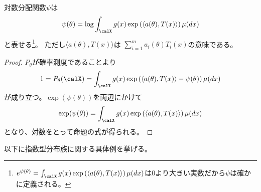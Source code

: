 \documentclass[report]{jlreq}
\begin{document}
\begin{proposition}[対数分配関数の式]
    対数分配関数$\psi$は
    \begin{equation}
        \psi(\theta)
            = \log \int_\calX g(x) \exp\myparen{
                \langle a(\theta), T(x) \rangle
            } \mu(dx)
    \end{equation}
    と表せる\footnote{
        $e^{\psi(\theta)} = \int_\calX g(x) \exp\myparen{
            \langle a(\theta), T(x) \rangle
        } \mu(dx)$は0より大きい実数だから$\psi$は確かに定義される。
    }。
    ただし$\langle a(\theta), T(x) \rangle$は
    $\sum_{i = 1}^m a_i(\theta) T_i(x)$の意味である。
\end{proposition}

\begin{proof}
    $P_\theta$が確率測度であることより
    \begin{equation}
        1
            = P_\theta(\calX)
            = \int_\calX g(x) \exp\myparen{
                \langle a(\theta), T(x) \rangle
                - \psi(\theta)
            } \mu(dx)
    \end{equation}
    が成り立つ。$\exp(\psi(\theta))$を両辺にかけて
    \begin{equation}
        \exp(\psi(\theta))
            = \int_\calX g(x) \exp\myparen{
                \langle a(\theta), T(x) \rangle
            } \mu(dx)
    \end{equation}
    となり、対数をとって命題の式が得られる。
\end{proof}

以下に指数型分布族に関する具体例を挙げる。
\end{document}
